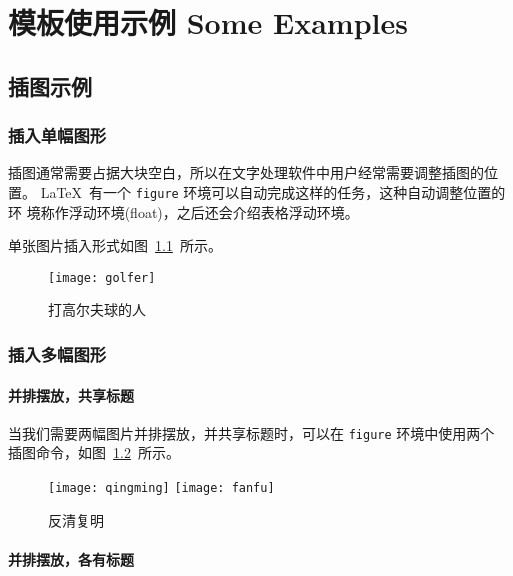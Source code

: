 \chapter{模板使用示例 Some Examples}
\label{cha:examples}

\section{插图示例}
\label{sec:figure}

\subsection{插入单幅图形}

插图通常需要占据大块空白，所以在文字处理软件中用户经常需要调整插图的位置。
\LaTeX~有一个 \texttt{figure} 环境可以自动完成这样的任务，这种自动调整位置的环
境称作浮动环境(float)，之后还会介绍表格浮动环境。

单张图片插入形式如图~\ref{fig:golfer}~所示。
\begin{figure}[htbp]
\centering
\texttt{[image: golfer]}
\caption{打高尔夫球的人}
\label{fig:golfer}
\end{figure}

\subsection{插入多幅图形}

\subsubsection*{并排摆放，共享标题}

当我们需要两幅图片并排摆放，并共享标题时，可以在 \texttt{figure} 环境中使用两个
插图命令，如图~\ref{fig:fanqingfuming}~所示。

\begin{figure}[htbp]
\centering
\texttt{[image: qingming]}
\hspace{36pt}
\texttt{[image: fanfu]}
\caption{反清复明}
\label{fig:fanqingfuming}
\end{figure}

\subsubsection*{并排摆放，各有标题}

